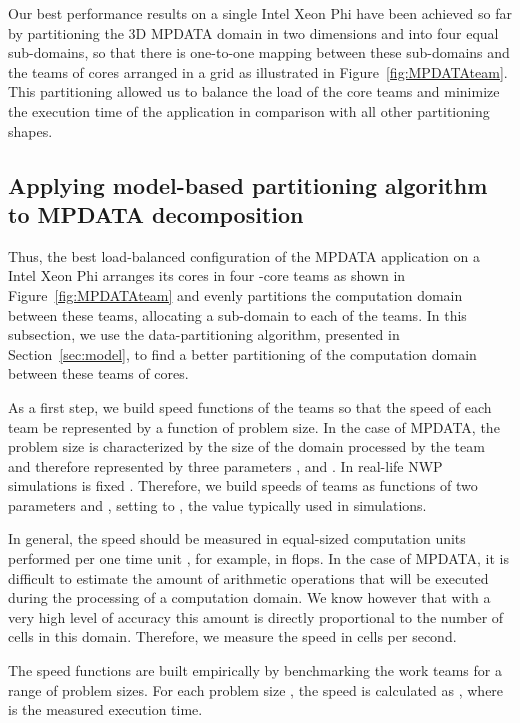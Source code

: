 \documentclass{acm_proc_article-sp}
\begin{document}
Our best performance results on a single Intel Xeon Phi have been achieved so far by partitioning the 3D  MPDATA domain in two dimensions  and  into four equal sub-domains, so that there is one-to-one mapping between these sub-domains and the teams of cores arranged in a  grid as illustrated in Figure~\ref{fig:MPDATAteam}. This partitioning allowed us to balance the load of the core teams and minimize the execution time of the application in comparison with all other partitioning shapes.

\subsection{Applying model-based partitioning algorithm to MPDATA decomposition}
\label{subsec:model}

Thus, the best load-balanced configuration of the MPDATA application on a Intel Xeon Phi arranges its cores in four -core teams as shown in Figure~\ref{fig:MPDATAteam} and evenly partitions the  computation domain between these teams, allocating a   sub-domain to each of the teams. In this subsection, we use the data-partitioning algorithm, presented in Section~\ref{sec:model}, to find a better partitioning of the computation domain between these teams of cores.  

As a first step, we build speed functions of the teams so that the speed of each team be represented by a function of problem size. In the case of MPDATA, the problem size is characterized by the size of the domain processed by the team and therefore represented by three parameters ,  and . In real-life NWP simulations  is fixed \cite{SZU15}. Therefore, we build speeds of teams as functions of two parameters  and , setting  to , the value typically used in simulations. 

In general, the speed should be measured in equal-sized computation units performed per one time unit \cite{ijhpca2007}, for example, in flops. In the case of MPDATA, it is difficult to estimate the amount of arithmetic operations that will be executed during the processing of a  computation domain. We know however that with a very high level of accuracy this amount is directly proportional to the number of cells in this domain. Therefore, we measure the speed in cells per second. 

The speed functions are built empirically by benchmarking the work teams for a range of problem sizes. For each problem size , the speed is calculated as , where  is the measured execution time. 
\end{document}
